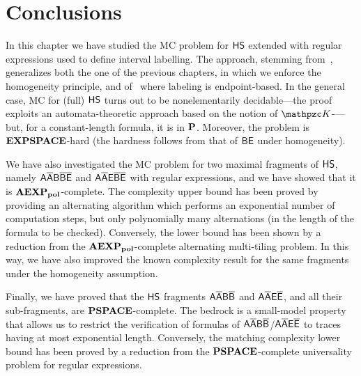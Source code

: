 \section{Conclusions}
In this chapter we have studied the MC problem for $\text{\sffamily HS}$ extended with regular expressions  used to define interval labelling. The approach, stemming from~\cite{lm16}, generalizes both the one of the previous chapters, in which we enforce the homogeneity principle, and of~\cite{LM13,LM14} where labeling is endpoint-based. 
In the general case, MC for (full) $\text{\sffamily HS}$ turns out to be nonelementarily decidable---the proof exploits an automata-theoretic approach based on the notion of $\Ku$-\NFA---%
but, for a constant-length formula,
it is in $\textbf{P}$.
Moreover, the problem is $\textbf{EXPSPACE}$-hard (the hardness follows from that of $\mathsf{BE}$ under homogeneity).

We have also investigated the MC problem for two maximal fragments of $\text{\sffamily HS}$, namely $\mathsf{A\overline{A}B\overline{B}}\mathsf{\overline{E}}$ and $\mathsf{A\overline{A}}\mathsf{E}\mathsf{\overline{B}}\mathsf{\overline{E}}$ with 
regular expressions, and we have showed that it is 
$\mathbf{AEXP_{pol}}$-complete.
The complexity upper bound has been proved by providing an alternating algorithm which performs an exponential number of computation steps, but only polynomially many alternations (in the length of the formula to be checked). 
Conversely, the lower bound has been shown by a reduction from the $\mathbf{AEXP_{pol}}$-complete alternating multi-tiling problem.
In this way, we have also improved the known complexity result for the same fragments under the homogeneity assumption.

Finally, we have proved that the $\text{\sffamily HS}$ fragments $\mathsf{A\overline{A}B\overline{B}}$ and $\mathsf{A\overline{A}E\overline{E}}$, and all  their sub-fragments, are $\textbf{PSPACE}$-complete.
The bedrock is a small-model property that allows us to restrict the verification of formulas of $\mathsf{A\overline{A}B\overline{B}}$/$\mathsf{A\overline{A}E\overline{E}}$ to traces having at most exponential length. 
Conversely, the matching complexity lower bound has been proved by a reduction from the $\textbf{PSPACE}$-complete universality problem for regular expressions.
